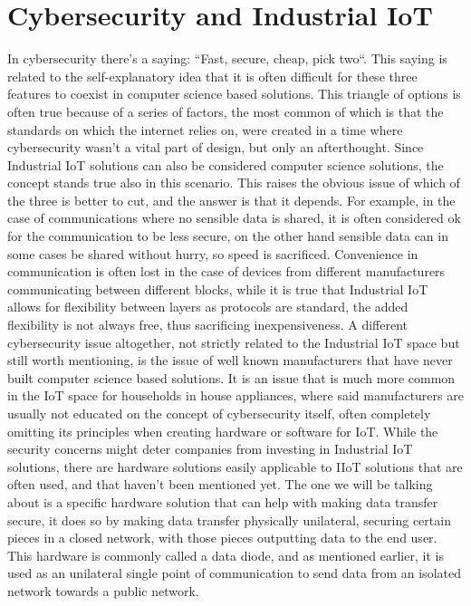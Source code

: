 \documentclass[a4paper, 12pt]{book}
\begin{document}
\section{Cybersecurity and Industrial IoT}
In cybersecurity there’s a saying: “Fast, secure, cheap, pick two“. This saying is related to the self-explanatory idea that it is often difficult for these three features to coexist in computer science based solutions. This triangle of options is often true because of a series of factors, the most common of which is that the standards on which the internet relies on, were created in a time where cybersecurity wasn’t a vital part of design, but only an afterthought. Since Industrial IoT solutions can also be considered computer science solutions, the concept stands true also in this scenario. This raises the obvious issue of which of the three is better to cut, and the answer is that it depends. For example, in the case of communications where no sensible data is shared, it is often considered ok for the communication to be less secure, on the other hand sensible data can in some cases be shared without hurry, so speed is sacrificed. Convenience in communication is often lost in the case of devices from different manufacturers communicating between different blocks, while it is true that Industrial IoT allows for flexibility between layers as protocols are standard, the added flexibility is not always free, thus sacrificing inexpensiveness.
A different cybersecurity issue altogether, not strictly related to the Industrial IoT space but still worth mentioning, is the issue of well known manufacturers that have never built computer science based solutions. It is an issue that is much more common in the IoT space for households in house appliances, where said manufacturers are usually not educated on the concept of cybersecurity itself, often completely omitting its principles when creating hardware or software for IoT.
While the security concerns might deter companies from investing in Industrial IoT solutions, there are hardware solutions easily applicable to IIoT solutions that are often used, and that haven’t been mentioned yet. The one we will be talking about is a specific hardware solution that can help with making data transfer secure, it does so by making data transfer physically unilateral, securing certain pieces in a closed network, with those pieces outputting data to the end user. This hardware is commonly called a data diode, and as mentioned earlier, it is used as an unilateral single point of communication to send data from an isolated network towards a public network.
\end{document}
